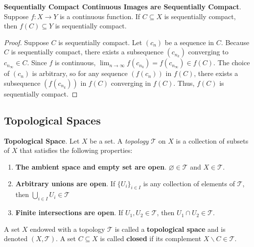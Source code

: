 \begin{theorem*}
    \textbf{Sequentially Compact Continuous Images are Sequentially Compact}. Suppose $f:X\to Y$ is a continuous function. If $C\subseteq X$ is sequentially compact, then $f(C)\subseteq Y$ is sequentially compact.
\end{theorem*} \begin{proof}
    Suppose $C$ is sequentially compact. Let $(c_n)$ be a sequence in $C$. Because $C$ is sequentially compact, there exists a subsequence $(c_{n_k})$ converging to $c_{n_\infty}\in C$. Since $f$ is continuous, $\displaystyle\lim_{n\to\infty}f(c_{n_k}) = f(c_{n_\infty})\in f(C)$. The choice of $(c_n)$ is arbitrary, so for any sequence $(f(c_n))$ in $f(C)$, there exists a subsequence $(f(c_{n_k}))$ in $f(C)$ converging in $f(C)$. Thus, $f(C)$ is sequentially compact.
\end{proof}

\newpage

\subsection{Topological Spaces}

\begin{framed}
\begin{defn}
    \textbf{Topological Space}. Let $X$ be a set. A \textit{topology} $\mathcal{T}$ on $X$ is a collection of subsets of $X$ that satisfies the following properties: \begin{enumerate}
        \item[] \textbf{The ambient space and empty set are open}. $\varnothing\in\mathcal{T}$ and $X\in\mathcal{T}$.
        \item[] \textbf{Arbitrary unions are open}. If $\{U_i\}_{i\in I}$ is any collection of elements of $\mathcal{T}$, then $\displaystyle\bigcup_{i\in I} U_i\in\mathcal{T}$
        \item[] \textbf{Finite intersections are open}. If $U_1,U_2\in \mathcal{T}$, then $U_1\cap U_2\in\mathcal{T}$.
    \end{enumerate} A set $X$ endowed with a topology $\mathcal{T}$ is called a \textbf{topological space} and is denoted $(X,\mathcal{T})$. A set $C\subseteq X$ is called \textbf{closed} if its complement $X\backslash C\in\mathcal{T}$.
\end{defn}
\end{framed}

